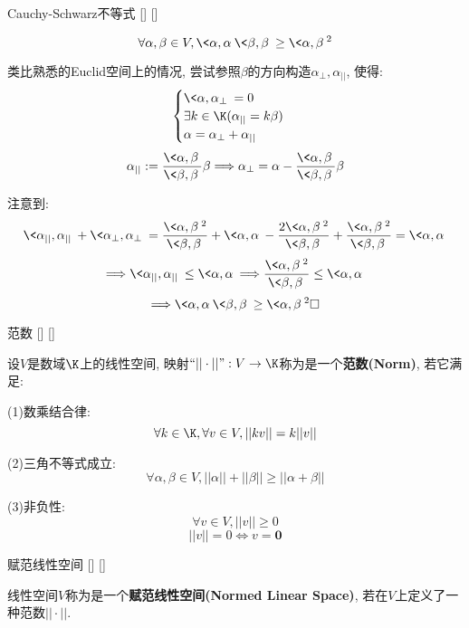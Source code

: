 \documentclass[UTF8]{ctexart}
\begin{document}
		\begin{thm}
			[]
			{Cauchy-Schwarz不等式}
			[]
			[]

			\[\forall\alpha, \beta\in V, \<\alpha,\alpha\>\<\beta,\beta\>\geq\<\alpha,\beta\>^2\]
		\end{thm}

		\begin{prf}
			类比熟悉的Euclid空间上的情况, 尝试参照$\beta$的方向构造$\alpha_\perp,\alpha_{||}$, 使得: 
			\[\begin{cases}
				\<\alpha,\alpha_\perp\>=0\\
				\exists k\in\K(\alpha_{||}=k\beta)\\
				\alpha=\alpha_\perp+\alpha_{||}
			\end{cases}\]
			\[\alpha_{||}:=\frac{\<\alpha,\beta\>}{\<\beta,\beta\>}\beta\Longrightarrow\alpha_\perp=\alpha-\frac{\<\alpha,\beta\>}{\<\beta,\beta\>}\beta\]

			注意到: 
			\[\<\alpha_{||},\alpha_{||}\>+\<\alpha_\perp,\alpha_\perp\>=\frac{\<\alpha,\beta\>^2}{\<\beta,\beta\>}+\<\alpha,\alpha\>-\frac{2\<\alpha,\beta\>^2}{\<\beta,\beta\>}+\frac{\<\alpha,\beta\>^2}{\<\beta,\beta\>}=\<\alpha,\alpha\>\]
			\[\Longrightarrow\<\alpha_{||},\alpha_{||}\>\leq\<\alpha,\alpha\>\Longrightarrow\frac{\<\alpha,\beta\>^2}{\<\beta,\beta\>}\leq\<\alpha,\alpha\>\]
			\[\Longrightarrow\<\alpha,\alpha\>\<\beta,\beta\>\geq\<\alpha,\beta\>^2\square\]
		\end{prf} 

		\begin{dfn}
			[]
			{范数}
			[]
			[]

			设$V$是数域$\K$上的线性空间, 映射$``||\cdot||":V\to\K$称为是一个\textbf{范数(Norm)}, 若它满足: 
			
			(1)数乘结合律: 
			\[\forall k\in\K, \forall v\in V, ||kv||=k||v||\]
			
			(2)三角不等式成立: 
			\[\forall \alpha,\beta\in V, ||\alpha||+||\beta||\geq||\alpha+\beta||\]
			
			(3)非负性: 
			\[\forall v\in V, ||v||\geq 0\]
			\[||v||=0\Longleftrightarrow v=\mathbf{0}\]
		\end{dfn}
		
		\begin{dfn}
			[]
			{赋范线性空间}
			[]
			[]

			线性空间$V$称为是一个\textbf{赋范线性空间(Normed Linear Space)}, 若在$V$上定义了一种范数$||\cdot||$. 
		\end{dfn}
		
\end{document}
